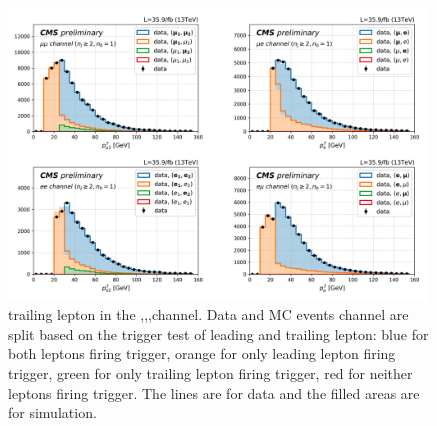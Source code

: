\begin{figure}[h]
  \centering
  \includegraphics[width=0.99\textwidth]{chapters/Analysis/sectionSelection/figures/trTest.png}
  \caption{trailing lepton \pt in the \cmm,\cee,\cme,\cem channel. Data and MC events channel are split based on the trigger test of leading and trailing lepton: blue for both leptons firing trigger, orange for only leading lepton firing trigger, green for only trailing lepton firing trigger, red for neither leptons firing trigger. The lines are for data and the filled areas are for simulation.
  \label{fig:analysis:selection:trTest}}
\end{figure}






 

 
 
 
 
















